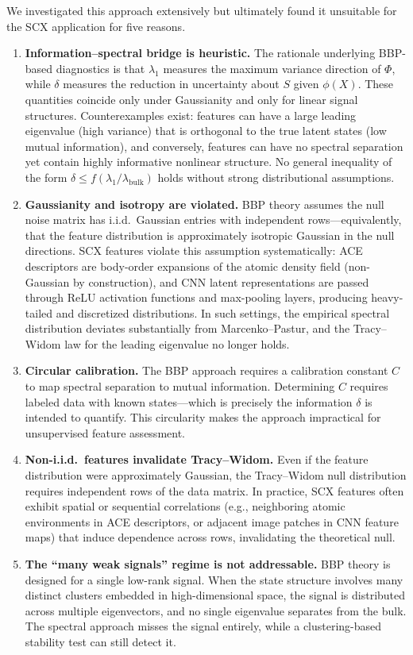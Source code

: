 We investigated this approach extensively but ultimately found it unsuitable for the SCX application for five reasons.

\begin{enumerate}
    \item \textbf{Information--spectral bridge is heuristic.} The rationale underlying BBP-based diagnostics is that $\lambda_1$ measures the maximum variance direction of $\Phi$, while $\delta$ measures the reduction in uncertainty about $S$ given $\phi(X)$. These quantities coincide only under Gaussianity and only for linear signal structures. Counterexamples exist: features can have a large leading eigenvalue (high variance) that is orthogonal to the true latent states (low mutual information), and conversely, features can have no spectral separation yet contain highly informative nonlinear structure. No general inequality of the form $\delta \leq f(\lambda_1/\lambda_{\text{bulk}})$ holds without strong distributional assumptions.
    \item \textbf{Gaussianity and isotropy are violated.} BBP theory assumes the null noise matrix has i.i.d.\ Gaussian entries with independent rows---equivalently, that the feature distribution is approximately isotropic Gaussian in the null directions. SCX features violate this assumption systematically: ACE descriptors are body-order expansions of the atomic density field (non-Gaussian by construction), and CNN latent representations are passed through ReLU activation functions and max-pooling layers, producing heavy-tailed and discretized distributions. In such settings, the empirical spectral distribution deviates substantially from Marcenko--Pastur, and the Tracy--Widom law for the leading eigenvalue no longer holds.
    \item \textbf{Circular calibration.} The BBP approach requires a calibration constant $C$ to map spectral separation to mutual information. Determining $C$ requires labeled data with known states---which is precisely the information $\delta$ is intended to quantify. This circularity makes the approach impractical for unsupervised feature assessment.
    \item \textbf{Non-i.i.d.\ features invalidate Tracy--Widom.} Even if the feature distribution were approximately Gaussian, the Tracy--Widom null distribution requires independent rows of the data matrix. In practice, SCX features often exhibit spatial or sequential correlations (e.g., neighboring atomic environments in ACE descriptors, or adjacent image patches in CNN feature maps) that induce dependence across rows, invalidating the theoretical null.
    \item \textbf{The ``many weak signals'' regime is not addressable.} BBP theory is designed for a single low-rank signal. When the state structure involves many distinct clusters embedded in high-dimensional space, the signal is distributed across multiple eigenvectors, and no single eigenvalue separates from the bulk. The spectral approach misses the signal entirely, while a clustering-based stability test can still detect it.
\end{enumerate}

